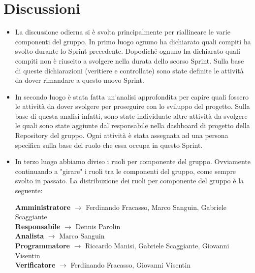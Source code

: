 \documentclass[a4paper,12pt]{article}
\begin{document}
\section{Discussioni}
\begin{itemize}
    \item La discussione odierna si è svolta principalmente per riallineare le varie componenti del gruppo. In primo luogo ognuno ha dichiarato quali compiti ha svolto durante lo Sprint precedente. Dopodiché ognuno ha dichiarato quali compiti non è riuscito a svolgere nella durata dello scorso Sprint. Sulla base di queste dichiarazioni (veritiere e controllate) sono state definite le attività da dover rimandare a questo nuovo Sprint.
    \item In secondo luogo è stata fatta un'analisi approfondita per capire quali fossero le attività da dover svolgere per proseguire con lo sviluppo del progetto. Sulla base di questa analisi infatti, sono state individuate altre attività da svolgere le quali sono state aggiunte dal responsabile nella dashboard di progetto della Repository del gruppo. Ogni attività è stata assegnata ad una persona specifica sulla base del ruolo che essa occupa in questo Sprint.
    \item In terzo luogo abbiamo diviso i ruoli per componente del gruppo. Ovviamente continuando a "girare" i ruoli tra le componenti del gruppo, come sempre svolto in passato. La distribuzione dei ruoli per componente del gruppo è la seguente:
    \begin{center}
        \textbf{Amministratore} $\rightarrow$ Ferdinando Fracasso, Marco Sanguin, Gabriele Scaggiante\\
        \textbf{Responsabile} $\rightarrow$ Dennis Parolin\\
        \textbf{Analista} $\rightarrow$ Marco Sanguin\\
        \textbf{Programmatore} $\rightarrow$ Riccardo Manisi, Gabriele Scaggiante, Giovanni Visentin\\
        \textbf{Verificatore} $\rightarrow$ Ferdinando Fracasso, Giovanni Visentin
    \end{center}
\end{itemize}

\pagebreak
\end{document}
